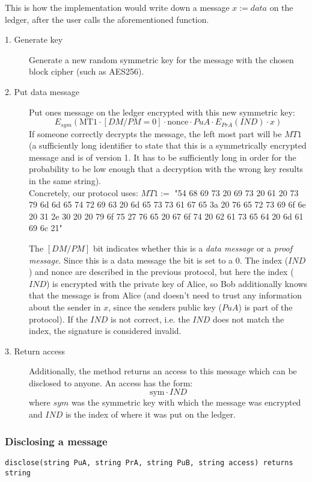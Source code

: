 \documentclass[a4paper]{article} %
\begin{document}
This is how the implementation would write down a message $x := data$ on the ledger, after the user calls the aforementioned function. 

\begin{description}
\item[1. Generate key] Generate a new random symmetric key for the message with the chosen block cipher (such as AES256).
\item[2. Put data message] Put ones message on the ledger encrypted with this new symmetric key: $$E_{sym}(\text{MT1} \cdot [DM/PM=0] \cdot \text{nonce} \cdot PuA \cdot E_{PrA}(IND) \cdot x)$$
    If someone correctly decrypts the message, the left most part will be $MT1$ (a sufficiently long identifier to state that this is a symmetrically encrypted message and is of version 1. It has to be sufficiently long in order for the probability to be low enough that a decryption with the wrong key results in the same string). \\
    Concretely, our protocol uses: $MT1 :=$ "54 68 69 73 20 69 73 20 61 20 73 79 6d 6d 65 74 72 69 63 20 6d 65 73 73 61 67 65 3a 20 76 65 72 73 69 6f 6e 20 31 2e 30 20 20 79 6f 75 27 76 65 20 67 6f 74 20 62 61 73 65 64 20 6d 61 69 6c 21"
    
    The $[DM/PM]$ bit indicates whether this is a \textit{data message} or a \textit{proof message}. Since this is a data message the bit is set to a 0.
    The index ($IND$) and nonce are described in the previous protocol, but here the index ($IND$) is encrypted with the private key of Alice, so Bob additionally knows that the message is from Alice (and doesn't need to trust any information about the sender in $x$, since the senders public key ($PuA$) is part of the protocol). If the $IND$ is not correct, i.e. the $IND$ does not match the index, the signature is considered invalid.
\item[3. Return access] Additionally, the method returns an access to this message which can be disclosed to anyone. An access has the form:
$$\text{sym} \cdot IND$$ where $sym$ was the symmetric key with which the message was encrypted and $IND$ is the index of where it was put on the ledger.




\end{description}

\subsubsection{Disclosing a message}
\lstinline{disclose(string PuA, string PrA, string PuB, string access) returns string}
\end{document}
